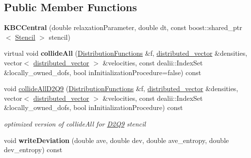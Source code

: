 \subsection*{Public Member Functions}
\begin{DoxyCompactItemize}
\item 
\hypertarget{classnatrium_1_1KBCCentral_a8ff99b6fd806fc4c2ca57442e97b8b4e}{
{\bfseries KBCCentral} (double relaxationParameter, double dt, const boost::shared\_\-ptr$<$ \hyperlink{classnatrium_1_1Stencil}{Stencil} $>$ stencil)}
\label{classnatrium_1_1KBCCentral_a8ff99b6fd806fc4c2ca57442e97b8b4e}

\item 
\hypertarget{classnatrium_1_1KBCCentral_a69d9c2442a56b439ecf1030be61ec117}{
virtual void {\bfseries collideAll} (\hyperlink{classnatrium_1_1DistributionFunctions}{DistributionFunctions} \&f, \hyperlink{namespacenatrium_a903d2b92917f582f2ff05f52160ab811}{distributed\_\-vector} \&densities, vector$<$ \hyperlink{namespacenatrium_a903d2b92917f582f2ff05f52160ab811}{distributed\_\-vector} $>$ \&velocities, const dealii::IndexSet \&locally\_\-owned\_\-dofs, bool inInitializationProcedure=false) const }
\label{classnatrium_1_1KBCCentral_a69d9c2442a56b439ecf1030be61ec117}

\item 
\hypertarget{classnatrium_1_1KBCCentral_a93dcaf32ed6176504c647906a279bd79}{
void \hyperlink{classnatrium_1_1KBCCentral_a93dcaf32ed6176504c647906a279bd79}{collideAllD2Q9} (\hyperlink{classnatrium_1_1DistributionFunctions}{DistributionFunctions} \&f, \hyperlink{namespacenatrium_a903d2b92917f582f2ff05f52160ab811}{distributed\_\-vector} \&densities, vector$<$ \hyperlink{namespacenatrium_a903d2b92917f582f2ff05f52160ab811}{distributed\_\-vector} $>$ \&velocities, const dealii::IndexSet \&locally\_\-owned\_\-dofs, bool inInitializationProcedure) const }
\label{classnatrium_1_1KBCCentral_a93dcaf32ed6176504c647906a279bd79}

\begin{DoxyCompactList}\small\item\em optimized version of collideAll for \hyperlink{classnatrium_1_1D2Q9}{D2Q9} stencil \item\end{DoxyCompactList}\item 
\hypertarget{classnatrium_1_1KBCCentral_a9bf3247cf13574f588cb5d6a65b6d30f}{
void {\bfseries writeDeviation} (double ave, double dev, double ave\_\-entropy, double dev\_\-entropy) const }
\label{classnatrium_1_1KBCCentral_a9bf3247cf13574f588cb5d6a65b6d30f}

\end{DoxyCompactItemize}
